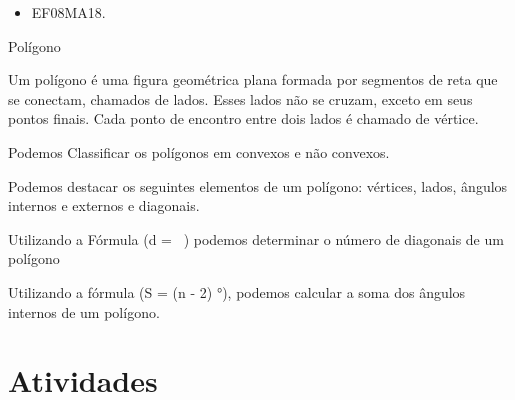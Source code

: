 {\begin{itemize}
\item EF08MA18.
\end{itemize}

Polígono

Um polígono é uma figura geométrica plana formada por segmentos de reta
que se conectam, chamados de lados. Esses lados não se cruzam, exceto em
seus pontos finais. Cada ponto de encontro entre dois lados é chamado de
vértice.

Podemos Classificar os polígonos em convexos e não convexos.

Podemos destacar os seguintes elementos de um polígono: vértices, lados,
ângulos internos e externos e diagonais.

Utilizando a Fórmula (d = \ ) podemos determinar o
número de diagonais de um polígono

Utilizando a fórmula (S = (n - 2) °), podemos calcular a
soma dos ângulos internos de um polígono.

\section{Atividades}





}
